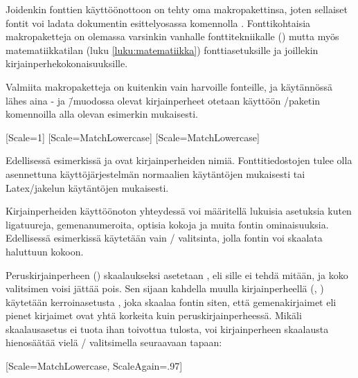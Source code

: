 Joidenkin fonttien käyttöönottoon on tehty oma makropakettinsa, joten
sellaiset fontit voi ladata dokumentin esittelyosassa komennolla
. Fonttikohtaisia makropaketteja on olemassa
varsinkin vanhalle fonttitekniikalle () mutta myös matematiikkatilan (luku \ref{luku:matematiikka})
fonttiasetuksille ja joillekin kir\-jain\-perhe\-koko\-nai\-suuk\-sille.

Valmiita makropaketteja on kuitenkin vain harvoille fonteille, ja
käytännössä lähes aina - ja 
\=/muodossa olevat kirjainperheet otetaan käyttöön
\-/paketin komennoilla alla olevan esimerkin
mukaisesti.

\begin{koodilohkosis}
  \setmainfont{TeX Gyre Termes}[Scale=1]
  \setsansfont{TeX Gyre Heros} [Scale=MatchLowercase]
  \setmonofont{TeX Gyre Cursor}[Scale=MatchLowercase]
\end{koodilohkosis}

Edellisessä esimerkissä  ja
 ovat kirjainperheiden nimiä. Fonttitiedostojen
tulee olla asennettuna käyttöjärjestelmän normaalien käytäntöjen
mukaisesti tai Latex\-/jakelun käytäntöjen mukaisesti.

Kirjainperheiden käyttöönoton yhteydessä voi määritellä lukuisia
asetuksia kuten ligatuureja, gemenanumeroita, optisia kokoja ja muita
fontin ominaisuuksia. Edellisessä esimerkissä käytetään vain
\-/ valitsinta, jolla fontin voi skaalata haluttuun kokoon.

Peruskirjainperheen () skaalaukseksi asetetaan
, eli sille ei tehdä mitään, ja koko valitsimen voisi
jättää pois. Sen sijaan kahdella muulla kirjainperheellä
(, ) käytetään kerroinasetusta
, joka skaalaa fontin siten, että gemenakirjaimet
eli pienet kirjaimet ovat yhtä korkeita kuin peruskirjainperheessä.
Mikäli skaalausasetus  ei tuota ihan toivottua
tulosta, voi kirjainperheen skaalausta hienosäätää vielä
\-/ valitsimella seuraavaan tapaan:

\begin{koodilohkosis}
  \setmonofont{TeX Gyre Cursor}
  [Scale=MatchLowercase, ScaleAgain=.97]
\end{koodilohkosis}

